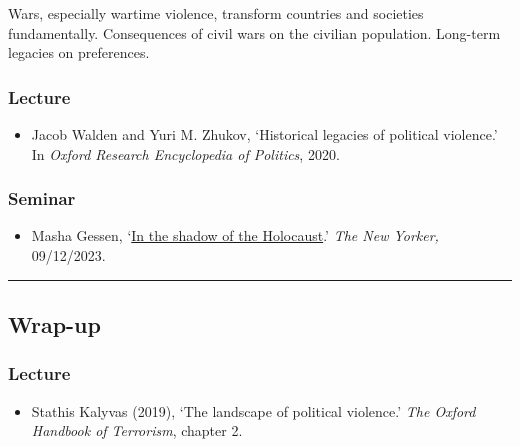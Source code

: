 \documentclass[12pt, a4paper]{article}
\begin{document}
Wars, especially wartime violence, transform countries and societies fundamentally. Consequences of civil wars on the civilian population. Long-term legacies on preferences.

\subsubsection*{Lecture}

\begin{itemize}
\setlength\itemsep{0pt}
\item Jacob Walden and Yuri M. Zhukov, `Historical legacies of political violence.' In \textit{Oxford Research Encyclopedia of Politics}, 2020.
\end{itemize}

\subsubsection*{Seminar}

\begin{itemize}
\setlength\itemsep{0pt}
\item Masha Gessen, `\href{https://www.newyorker.com/news/the-weekend-essay/in-the-shadow-of-the-holocaust}{In the shadow of the Holocaust}.' \textit{The New Yorker,} 09/12/2023.
\end{itemize}


\hrule %

\subsection{Wrap-up}

\subsubsection*{Lecture}

\begin{itemize}
\setlength\itemsep{0pt}
\item Stathis Kalyvas (2019), `The landscape of political violence.' \textit{The Oxford Handbook of Terrorism}, chapter 2.
\end{itemize}
\end{document}
